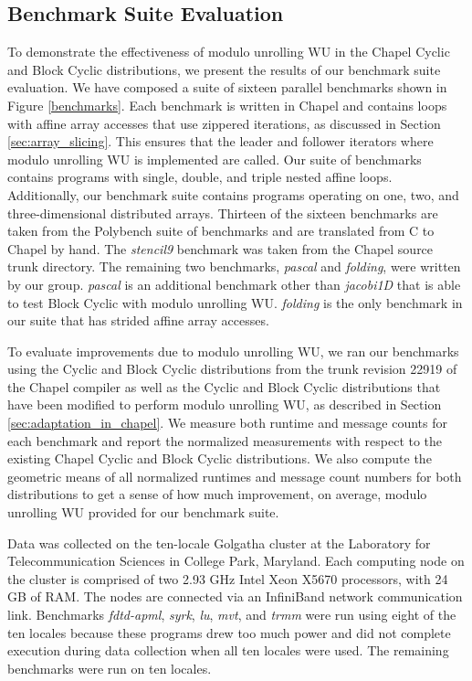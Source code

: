 \subsection{Benchmark Suite Evaluation}\label{subsec:benchmark_suite_evaluation}

To demonstrate the effectiveness of modulo unrolling WU in the Chapel Cyclic and Block Cyclic distributions, we present the results of our benchmark suite evaluation. We have composed a suite of sixteen parallel benchmarks shown in Figure \ref{benchmarks}. Each benchmark is written in Chapel and contains loops with affine array accesses that use zippered iterations, as discussed in Section \ref{sec:array_slicing}. This ensures that the leader and follower iterators where modulo unrolling WU is implemented are called. Our suite of benchmarks contains programs with single, double, and triple nested affine loops. Additionally, our benchmark suite contains programs operating on one, two, and three-dimensional distributed arrays. Thirteen of the sixteen benchmarks are taken from the Polybench suite of benchmarks \cite{polybench} and are translated from C to Chapel by hand. The \textit{stencil9} benchmark was taken from the Chapel source trunk directory. The remaining two benchmarks, \textit{pascal} and \textit{folding}, were written by our group. \textit{pascal} is an additional benchmark other than \textit{jacobi1D} that is able to test Block Cyclic with modulo unrolling WU. \textit{folding} is the only benchmark in our suite that has strided affine array accesses. 

To evaluate improvements due to modulo unrolling WU, we ran our benchmarks using the Cyclic and Block Cyclic distributions from the trunk revision 22919 of the Chapel compiler as well as the Cyclic and Block Cyclic distributions that have been modified to perform modulo unrolling WU, as described in Section \ref{sec:adaptation_in_chapel}. We measure both runtime and message counts for each benchmark and report the normalized measurements with respect to the existing Chapel Cyclic and Block Cyclic distributions. We also compute the geometric means of all normalized runtimes and message count numbers for both distributions to get a sense of how much improvement, on average, modulo unrolling WU provided for our benchmark suite. 

Data was collected on the ten-locale Golgatha cluster at the Laboratory for Telecommunication Sciences in College Park, Maryland. Each computing node on the cluster is comprised of two 2.93 GHz Intel Xeon X5670 processors, with 24 GB of RAM. The nodes are connected via an InfiniBand network communication link. Benchmarks \textit{fdtd-apml}, \textit{syrk}, \textit{lu}, \textit{mvt}, and \textit{trmm} were run using eight of the ten locales because these programs drew too much power and did not complete execution during data collection when all ten locales were used. The remaining benchmarks were run on ten locales. 

